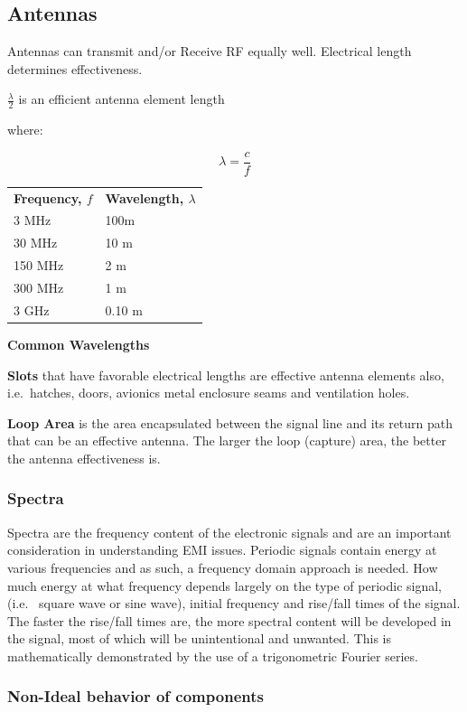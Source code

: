 \documentclass[
]{book}
\begin{document}
\hypertarget{antennas}{%
\subsection{Antennas}\label{antennas}}

Antennas can transmit and/or Receive RF equally well. Electrical length
determines effectiveness.

\(\frac{\lambda}{2}\) is an efficient antenna element length

where:

\[
\lambda = \frac{c}{f}
\]

\begin{longtable}[]{@{}ll@{}}
\toprule
\endhead
\textbf{Frequency, \(f\)} & \textbf{Wavelength, \(\lambda\)}\tabularnewline
3 MHz & 100m\tabularnewline
30 MHz & 10 m\tabularnewline
150 MHz & 2 m\tabularnewline
300 MHz & 1 m\tabularnewline
3 GHz & 0.10 m\tabularnewline
\bottomrule
\end{longtable}

\textbf{Common Wavelengths}

\textbf{Slots} that have favorable electrical lengths are effective antenna elements
also, i.e.~hatches, doors, avionics metal enclosure seams and ventilation holes.

\textbf{Loop Area} is the area encapsulated between the signal line and its return
path that can be an effective antenna. The larger the loop (capture) area, the
better the antenna effectiveness is.

\hypertarget{spectra}{%
\subsubsection{Spectra}\label{spectra}}

Spectra are the frequency content of the electronic signals and are an important
consideration in understanding EMI issues. Periodic signals contain energy at
various frequencies and as such, a frequency domain approach is needed. How much
energy at what frequency depends largely on the type of periodic signal, (i.e.~
square wave or sine wave), initial frequency and rise/fall times of the signal.
The faster the rise/fall times are, the more spectral content will be developed
in the signal, most of which will be unintentional and unwanted. This is
mathematically demonstrated by the use of a trigonometric Fourier series.

\hypertarget{non-ideal-behavior-of-components}{%
\subsubsection{Non-Ideal behavior of components}\label{non-ideal-behavior-of-components}}
\end{document}
